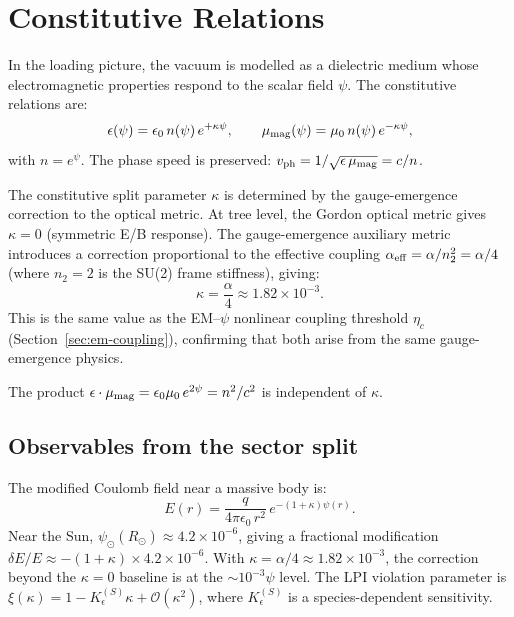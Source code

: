 \documentclass[aps,prd,twocolumn,superscriptaddress,nofootinbib]{revtex4-2}
\begin{document}
\section{Constitutive Relations}
\label{sec:constitutive}

In the loading picture, the vacuum is modelled as a dielectric medium
whose electromagnetic properties respond to the scalar field $\psi$.
The constitutive relations are:
\begin{equation}
\epsilon(\psi) = \epsilon_0\, n(\psi)\, e^{+\kappa\psi}, \qquad
\mu_{\rm mag}(\psi) = \mu_0\, n(\psi)\, e^{-\kappa\psi},
\label{eq:constitutive}
\end{equation}
with $n = e^\psi$.  The phase speed is preserved:
$v_{\rm ph} = 1/\sqrt{\epsilon\,\mu_{\rm mag}} = c/n$.

The constitutive split parameter $\kappa$ is determined by the
gauge-emergence correction to the optical metric.  At tree level, the
Gordon optical metric gives $\kappa = 0$ (symmetric E/B response).  The
gauge-emergence auxiliary metric introduces a correction proportional to
the effective coupling $\alpha_{\rm eff} = \alpha/n_2^2 = \alpha/4$
(where $n_2 = 2$ is the SU(2) frame stiffness), giving:
\begin{equation}
\boxed{\kappa = \frac{\alpha}{4} \approx 1.82 \times 10^{-3}.}
\label{eq:kappa-derived}
\end{equation}
This is the same value as the EM--$\psi$ nonlinear coupling threshold
$\eta_c$ (Section~\ref{sec:em-coupling}), confirming that both arise
from the same gauge-emergence physics.

The product $\epsilon\cdot\mu_{\rm mag} = \epsilon_0\mu_0\, e^{2\psi}
= n^2/c^2$ is independent of $\kappa$.

\subsection{Observables from the sector split}

The modified Coulomb field near a massive body is:
\begin{equation}
E(r) = \frac{q}{4\pi\epsilon_0\, r^2}\, e^{-(1+\kappa)\psi(r)}.
\label{eq:coulomb-modified}
\end{equation}
Near the Sun, $\psi_\odot(R_\odot) \approx 4.2\times 10^{-6}$, giving
a fractional modification $\delta E/E \approx -(1+\kappa)\times
4.2\times 10^{-6}$.  With $\kappa = \alpha/4 \approx 1.82 \times 10^{-3}$,
the correction beyond the $\kappa = 0$ baseline is at the $\sim 10^{-3}\psi$
level.  The LPI violation parameter is
$\xi(\kappa) = 1 - K_\epsilon^{(S)}\kappa + \mathcal{O}(\kappa^2)$,
where $K_\epsilon^{(S)}$ is a species-dependent sensitivity.
\end{document}
